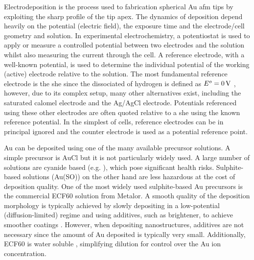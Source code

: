 \documentclass{article}
\begin{document}

Electrodeposition is the process used to fabrication spherical Au \gls{afm} tips by exploiting the sharp profile of the tip apex. The dynamics of deposition depend heavily on the potential (electric field), the exposure time and the electrode/cell geometry and solution. In experimental electrochemistry, a potentiostat is used to apply or measure a controlled potential between two electrodes and the solution whilst also measuring the current through the cell. A reference electrode, with a well-known potential, is used to determine the individual potential of the working (active) electrode relative to the solution. The most fundamental reference electrode is the \gls{she} since the dissociated of hydrogen is defined as $E^o=\SI{0}{V}$ \cite{paunovic2006fundamentals}, however, due to its complex setup, many other alternatives exist, including the saturated calomel electrode and the Ag/AgCl electrode. Potentials referenced using these other electrodes are often quoted relative to a \gls{she} using the known reference potential. In the simplest of cells, reference electrodes can be in principal ignored and the counter electrode is used as a potential reference point.

Au can be deposited using one of the many available precursor solutions. A simple precursor is AuCl but it is not particularly widely used. A large number of solutions are cyanide based (e.g. ), which pose significant health risks. Sulphite-based solutions (Au(SO)\sups{3\textminus}) on the other hand are less hazardous at the cost of deposition quality. One of the most widely used sulphite-based Au precursors is the commercial ECF60 solution from Metalor. A smooth quality of the deposition morphology is typically achieved by slowly depositing in a low-potential (diffusion-limited) regime and using additives, such as brightener, to achieve smoother coatings \cite{oniciu1991some}. However, when depositing nanostructures, additives are not necessary since the amount of Au deposited is typically very small. Additionally, ECF60 is water soluble \cite{roy2009electrochemical}, simplifying dilution for control over the Au ion concentration.
\end{document}
